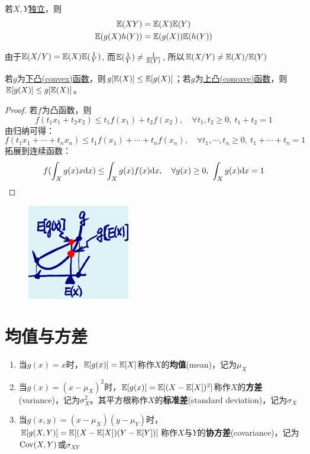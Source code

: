 \begin{proposition}[独立变量的期望]
    若$X,Y$\underline{独立}，则
    \begin{gather*}
        \mathbb{E}(XY)=\mathbb{E}(X)\mathbb{E}(Y) \\
        \mathbb{E}(g(X)h(Y))=\mathbb{E}(g(X))\mathbb{E}(h(Y))
    \end{gather*}
\end{proposition}

\begin{remark}
    由于$\mathbb{E}(X/Y)= \mathbb{E}(X)\mathbb{E}(\frac1{Y})$, 而$\mathbb{E}(\frac1{Y}) \neq \frac1{\mathbb{E}(Y)}$, 所以$\mathbb{E}(X/Y)\neq \mathbb{E}(X)/\mathbb{E}(Y)$
\end{remark}

\begin{theorem}[Jensen不等式]
    若$g$为\underline{下凸(convex)函数}，则$g[\mathbb{E}(X)] \le \mathbb{E}[g(X)]$；若$g$为\underline{上凸(concave)函数}，则$\mathbb{E}[g(X)] \le  g[\mathbb{E}(X)]$。
\end{theorem}
\begin{proof}
    若$f$为凸函数，则
    \[ f(t_1x_1+t_2x_2) \le t_1f(x_1)+t_2f(x_2) ,\quad \forall t_1,t_2 \ge 0 ,\ t_1+t_2=1 \]
    由归纳可得：
    \[ f(t_1x_1+ \cdots +t_nx_n) \le t_1f(x_1)+ \cdots +t_nf(x_n) ,\quad \forall t_1,\cdots ,t_n \ge 0 ,\ t_1+ \cdots +t_n=1 \]
    拓展到连续函数：
    \[ f(\int_Xg(x)x \mathrm{d} x) \le \int_Xg(x)f(x) \mathrm{d} x ,\quad \forall g(x) \ge 0 ,\ \int_Xg(x) \mathrm{d} x=1 \]
\end{proof}

\begin{figure}[h]
    \centering
    \includegraphics{image/trans_mean.png}
\end{figure}

\section{均值与方差}

\begin{definition}
    \begin{enumerate}
        \item 当$g(x)=x$时，$\mathbb{E}[g(x)]=\mathbb{E}[X]$称作$X$的\textbf{均值}(mean)，记为$\mu_X$
        \item 当$g(x)=(x-\mu_X)^{2}$时，$\mathbb{E}[g(x)]=\mathbb{E}[(X-\mathbb{E}[X])^{2}]$称作$X$的\textbf{方差}(variance)，记为$\sigma^2_X$。其平方根称作$X$的\textbf{标准差}(standard deviation)，记为$\sigma_X$
        \item 当$g(x,y)=(x-\mu_X)(y-\mu_Y)$时，$\mathbb{E}[g(X,Y)]=\mathbb{E}[(X-\mathbb{E}[X])(Y-\mathbb{E}[Y])]$称作$X$与$Y$的\textbf{协方差}(covariance)，记为$\operatorname{Cov}(X,Y)$或$\sigma_{XY}$
    \end{enumerate}
\end{definition}

